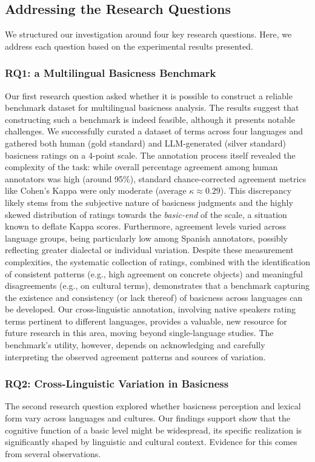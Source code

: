 \documentclass[preprint,12pt,authoryear]{elsarticle}
\begin{document}
\subsection{Addressing the Research Questions}

We structured our investigation around four key research questions. Here, we address each question based on the experimental results presented.

\subsubsection{RQ1: a Multilingual Basicness Benchmark}
Our first research question asked whether it is possible to construct a reliable benchmark dataset for multilingual basicness analysis. The results suggest that constructing such a benchmark is indeed feasible, although it presents notable challenges. We successfully curated a dataset of terms across four languages and gathered both human (gold standard) and LLM-generated (silver standard) basicness ratings on a 4-point scale. The annotation process itself revealed the complexity of the task: while overall percentage agreement among human annotators was high (around 95\%), standard chance-corrected agreement metrics like Cohen's Kappa were only moderate (average $\kappa \approx 0.29$). This discrepancy likely stems from the subjective nature of basicness judgments and the highly skewed distribution of ratings towards the \textit{basic-end} of the scale, a situation known to deflate Kappa scores. Furthermore, agreement levels varied across language groups, being particularly low among Spanish annotators, possibly reflecting greater dialectal or individual variation. Despite these measurement complexities, the systematic collection of ratings, combined with the identification of consistent patterns (e.g., high agreement on concrete objects) and meaningful disagreements (e.g., on cultural terms), demonstrates that a benchmark capturing the existence and consistency (or lack thereof) of basicness across languages can be developed. Our cross-linguistic annotation, involving native speakers rating terms pertinent to different languages, provides a valuable, new resource for future research in this area, moving beyond single-language studies. The benchmark's utility, however, depends on acknowledging and carefully interpreting the observed agreement patterns and sources of variation.

\subsubsection{RQ2: Cross-Linguistic Variation in Basicness}
The second research question explored whether basicness perception and lexical form vary across languages and cultures. Our findings support show that the cognitive function of a basic level might be widespread, its specific realization is significantly shaped by linguistic and cultural context. Evidence for this comes from several observations.
\end{document}
